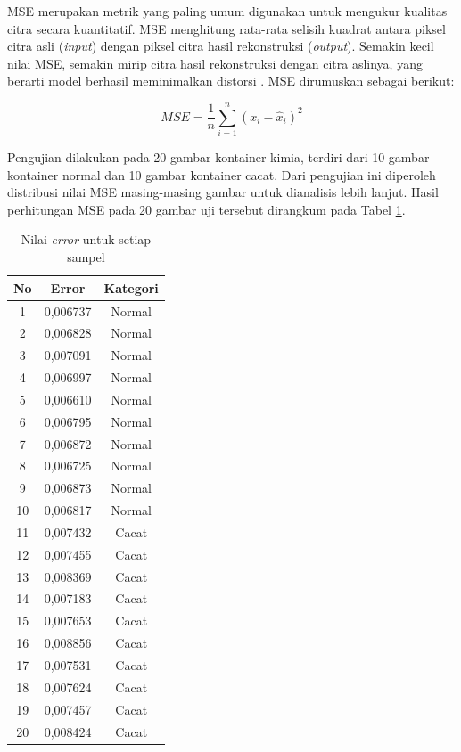 MSE merupakan metrik yang paling umum digunakan untuk mengukur
kualitas citra secara kuantitatif. MSE menghitung rata-rata selisih
kuadrat antara piksel citra asli (\textit{input}) dengan piksel citra hasil
rekonstruksi (\textit{output}). Semakin kecil nilai MSE, semakin mirip citra
hasil rekonstruksi dengan citra aslinya, yang berarti model berhasil
meminimalkan distorsi \citep{27}. MSE dirumuskan sebagai berikut:

\begin{equation}
  MSE = \frac{1}{n} \sum_{i=1}^{n} (x_i - \hat{x}_i)^2
\end{equation}

Pengujian dilakukan pada 20 gambar kontainer kimia, terdiri dari 10
gambar kontainer normal dan 10 gambar kontainer cacat. Dari pengujian
ini diperoleh distribusi nilai MSE masing-masing gambar untuk
dianalisis lebih lanjut. Hasil perhitungan MSE pada 20 gambar uji
tersebut dirangkum pada Tabel \ref{tab:error-samples}.

\begin{table}[H]
  \centering
  \caption{Nilai \textit{error} untuk setiap sampel}
  \label{tab:error-samples}
  \begin{tabular}{ccc}
    \toprule
    \textbf{No} & \textbf{Error} & \textbf{Kategori} \\
    \midrule
    1  & 0,006737 & Normal \\
    2  & 0,006828 & Normal \\
    3  & 0,007091 & Normal \\
    4  & 0,006997 & Normal \\
    5  & 0,006610 & Normal \\
    6  & 0,006795 & Normal \\
    7  & 0,006872 & Normal \\
    8  & 0,006725 & Normal \\
    9  & 0,006873 & Normal \\
    10 & 0,006817 & Normal \\
    11 & 0,007432 & Cacat \\
    12 & 0,007455 & Cacat \\
    13 & 0,008369 & Cacat \\
    14 & 0,007183 & Cacat \\
    15 & 0,007653 & Cacat \\
    16 & 0,008856 & Cacat \\
    17 & 0,007531 & Cacat \\
    18 & 0,007624 & Cacat \\
    19 & 0,007457 & Cacat \\
    20 & 0,008424 & Cacat \\
    \bottomrule
  \end{tabular}
\end{table}

